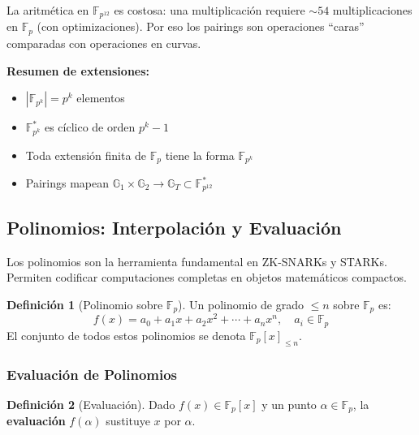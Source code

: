 \documentclass[11pt,a4paper,twoside,openright]{book}
\theoremstyle{definition}
\newtheorem{definition}{Definición}[chapter]
\theoremstyle{plain}
\theoremstyle{remark}
\begin{document}
\begin{advertencia}
La aritmética en $\mathbb{F}_{p^{12}}$ es costosa: una multiplicación requiere $\sim 54$ multiplicaciones en $\mathbb{F}_p$ (con optimizaciones). Por eso los pairings son operaciones ``caras'' comparadas con operaciones en curvas.
\end{advertencia}

\begin{keyidea}
\textbf{Resumen de extensiones:}
\begin{itemize}
    \item $|\mathbb{F}_{p^k}| = p^k$ elementos
    \item $\mathbb{F}_{p^k}^*$ es cíclico de orden $p^k - 1$
    \item Toda extensión finita de $\mathbb{F}_p$ tiene la forma $\mathbb{F}_{p^k}$
    \item Pairings mapean $\mathbb{G}_1 \times \mathbb{G}_2 \to \mathbb{G}_T \subset \mathbb{F}_{p^{12}}^*$
\end{itemize}
\end{keyidea}

\subsection{Polinomios: Interpolación y Evaluación}

Los polinomios son la herramienta fundamental en ZK-SNARKs y STARKs. Permiten codificar computaciones completas en objetos matemáticos compactos.

\begin{definition}[Polinomio sobre $\mathbb{F}_p$]
Un polinomio de grado $\leq n$ sobre $\mathbb{F}_p$ es:
\[ f(x) = a_0 + a_1 x + a_2 x^2 + \cdots + a_n x^n, \quad a_i \in \mathbb{F}_p \]
El conjunto de todos estos polinomios se denota $\mathbb{F}_p[x]_{\leq n}$.
\end{definition}

\subsubsection{Evaluación de Polinomios}

\begin{definition}[Evaluación]
Dado $f(x) \in \mathbb{F}_p[x]$ y un punto $\alpha \in \mathbb{F}_p$, la \textbf{evaluación} $f(\alpha)$ sustituye $x$ por $\alpha$.
\end{definition}
\end{document}
